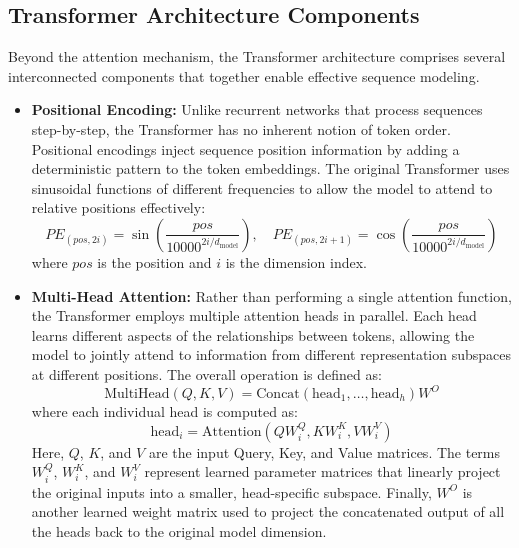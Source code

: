 \subsection{Transformer Architecture Components}
\label{sec:transformer_components}

Beyond the attention mechanism, the Transformer architecture comprises several interconnected components that together enable effective sequence modeling.

\begin{itemize}
	\item \textbf{Positional Encoding:} Unlike recurrent networks that process sequences step-by-step, the Transformer has no inherent notion of token order. Positional encodings inject sequence position information by adding a deterministic pattern to the token embeddings. The original Transformer uses sinusoidal functions of different frequencies to allow the model to attend to relative positions effectively:
	      \begin{equation}
		      PE_{(pos,2i)} = \sin\left(\frac{pos}{10000^{2i/d_{\text{model}}}}\right), \quad
		      PE_{(pos,2i+1)} = \cos\left(\frac{pos}{10000^{2i/d_{\text{model}}}}\right)
	      \end{equation}
	      where $pos$ is the position and $i$ is the dimension index.

	\item \textbf{Multi-Head Attention:} Rather than performing a single attention function, the Transformer employs multiple attention heads in parallel. Each head learns different aspects of the relationships between tokens, allowing the model to jointly attend to information from different representation subspaces at different positions. The overall operation is defined as:
	      \begin{equation}
		      \text{MultiHead}(Q, K, V) = \text{Concat}(\text{head}_1, \ldots, \text{head}_h)W^O
	      \end{equation}
	      where each individual head is computed as:
	      \begin{equation}
		      \text{head}_i = \text{Attention}(QW_i^Q, KW_i^K, VW_i^V)
	      \end{equation}
	      Here, $Q$, $K$, and $V$ are the input Query, Key, and Value matrices. The terms $W_i^Q$, $W_i^K$, and $W_i^V$ represent learned parameter matrices that linearly project the original inputs into a smaller, head-specific subspace. Finally, $W^O$ is another learned weight matrix used to project the concatenated output of all the heads back to the original model dimension.


\end{itemize}
